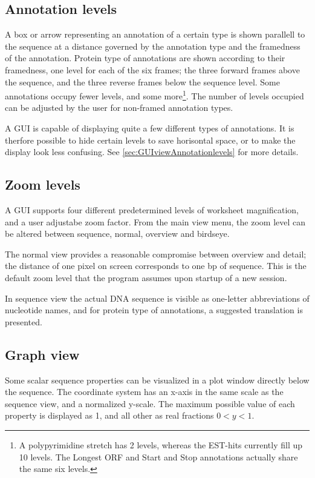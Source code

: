 \subsection{Annotation levels}
A box or arrow representing an annotation of a certain type is shown
parallell to the sequence at a distance governed by the annotation
type and the framedness of the annotation. Protein type of annotations
are shown according to their framedness, one level for each of the six
frames; the three forward frames above the sequence, and the three
reverse frames below the sequence level. Some annotations occupy fewer
levels, and some more\footnote{A polypyrimidine stretch has 2 levels,
whereas the EST-hits currently fill up 10 levels. The Longest ORF and
Start and Stop annotations actually share the same six levels.}. The
number of levels occupied can be adjusted by the user for non-framed
annotation types.

A GUI is capable of displaying quite a few different types of
annotations. It is therfore possible to hide certain levels to save
horisontal space, or to make the display look less confusing.  See
\ref{sec:GUIviewAnnotationlevels} for more details.

\subsection{Zoom levels}
A GUI supports four different predetermined levels of worksheet
magnification, and a user adjustabe zoom factor. From the main view
menu, the zoom level can be altered between sequence, normal, overview
and birdseye.

The normal view provides a reasonable compromise between overview and
detail; the distance of one pixel on screen corresponds to one bp of
sequence. This is the default zoom level that the program assumes upon
startup of a new session.

In sequence view the actual DNA sequence is visible as one-letter
abbreviations of nucleotide names, and for protein type of annotations,
a suggested translation is presented.

\subsection{Graph view}
Some scalar sequence properties can be visualized in a plot window
directly below the sequence. The coordinate system has an x-axis in
the same scale as the sequence view, and a normalized y-scale. The
maximum possible value of each property is displayed as 1, and all
other as real fractions $0<y<1$.

